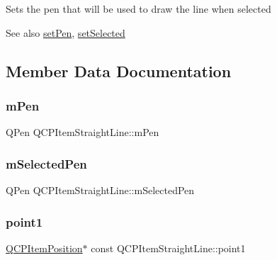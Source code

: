 Sets the pen that will be used to draw the line when selected

\begin{DoxySeeAlso}{See also}
\mbox{\hyperlink{class_q_c_p_item_straight_line_a9f36c9c9e60d7d9ac084c80380ac8601}{set\+Pen}}, \mbox{\hyperlink{class_q_c_p_abstract_item_a203de94ad586cc44d16c9565f49d3378}{set\+Selected}} 
\end{DoxySeeAlso}


\subsection{Member Data Documentation}
\mbox{\label{class_q_c_p_item_straight_line_a15106ddc2ebd73ed5c1bc57aa92bee8f}} 
\subsubsection{\texorpdfstring{mPen}{mPen}}
{\footnotesize\ttfamily Q\+Pen Q\+C\+P\+Item\+Straight\+Line\+::m\+Pen\hspace{0.3cm}{\ttfamily [protected]}}

\mbox{\label{class_q_c_p_item_straight_line_a0307a0d56a018656adbf798bc84c2a4b}} 
\subsubsection{\texorpdfstring{mSelectedPen}{mSelectedPen}}
{\footnotesize\ttfamily Q\+Pen Q\+C\+P\+Item\+Straight\+Line\+::m\+Selected\+Pen\hspace{0.3cm}{\ttfamily [protected]}}

\mbox{\label{class_q_c_p_item_straight_line_ac131a6ffe456f2cc7364dce541fe0120}} 
\subsubsection{\texorpdfstring{point1}{point1}}
{\footnotesize\ttfamily \mbox{\hyperlink{class_q_c_p_item_position}{Q\+C\+P\+Item\+Position}}$\ast$ const Q\+C\+P\+Item\+Straight\+Line\+::point1}

